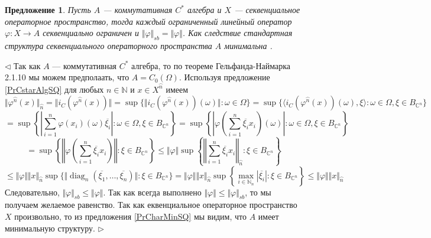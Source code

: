 \documentclass[12pt]{article}
\newtheorem{proposition}[theorem]{Предложение}
\newenvironment{proof}{\par $\triangleleft$}{$\triangleright$}
\begin{document}
\begin{proposition}\label{PrCommCstarAlgIsMin} Пусть $A$ --- коммутативная $C^*$ алгебра и $X$ --- секвенциальное операторное пространство, тогда каждый ограниченный линейный оператор $\varphi:X\to A$ секвенциально ограничен и $\Vert\varphi\Vert_{sb}=\Vert\varphi\Vert$. Как следствие стандартная структура секвенциального операторного пространства $A$ минимальна	.
\end{proposition}
\begin{proof} Так как $A$ --- коммутативная $C^*$ алгебра, то по теореме Гельфанда-Наймарка 2.1.10 \cite{MurphCstarOpTh} мы можем предполаать, что $A=C_0(\Omega)$. Используя предложение \ref{PrCstarAlgSQ} для любых $n\in\mathbb{N}$ и $x\in X^{\wideparen{n}}$ имеем 
$$
\Vert\varphi^{\wideparen{n}}(x)\Vert_{\wideparen{n}}
=\Vert i_C(\varphi^{\wideparen{n}}(x))\Vert
=\sup\{\Vert i_C(\varphi^{\wideparen{n}}(x))(\omega)\Vert:\omega\in\Omega\}
=\sup\{\langle i_C(\varphi^{\wideparen{n}}(x))(\omega),\xi\rangle:\omega\in\Omega,\xi\in B_{\mathbb{C}^n}\}
$$
$$
=\sup\left\{\left|\sum_{i=1}^n \varphi(x_i)(\omega)\overline{\xi_i}\right|:\omega\in\Omega,\xi\in B_{\mathbb{C}^n}\right\}
=\sup\left\{\left| \varphi\left(\sum_{i=1}^n \overline{\xi_i} x_i\right)(\omega)\right|:\omega\in\Omega,\xi\in B_{\mathbb{C}^n}\right\}
$$
$$
=\sup\left\{\left\Vert \varphi\left(\sum_{i=1}^n \overline{\xi_i} x_i\right)\right\Vert:\xi\in B_{\mathbb{C}^n}\right\}
\leq\Vert\varphi\Vert\sup\left\{\left\Vert \sum_{i=1}^n \overline{\xi_i} x_i\right\Vert_{\wideparen{n}}:\xi\in B_{\mathbb{C}^n}\right\}
$$
$$
\leq\Vert\varphi\Vert\Vert x\Vert_{\wideparen{n}}\sup\{\Vert\operatorname{diag}_n(\overline{\xi_1},\ldots,\overline{\xi_n})\Vert:\xi\in B_{\mathbb{C}^n}\}
=\Vert\varphi\Vert\Vert x\Vert_{\wideparen{n}}\sup\left\{\max_{i\in\mathbb{N}_n}|\overline{\xi_i}|:\xi\in B_{\mathbb{C}^n}\right\}
\leq\Vert\varphi\Vert\Vert x\Vert_{\wideparen{n}}
$$
Следовательно, $\Vert\varphi\Vert_{sb}\leq\Vert\varphi\Vert$. Так как всегда выполнено $\Vert\varphi\Vert\leq\Vert\varphi\Vert_{sb}$, то мы получаем желаемое равенство. Так как еквенциальное операторное пространство $X$ произвольно, то из предложения \ref{PrCharMinSQ} мы видим, что $A$ имеет минимальную структуру.
\end{proof}
\end{document}
